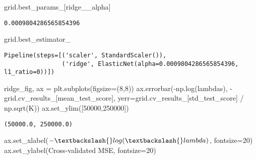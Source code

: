 \documentclass[
  letterpaper,
  DIV=11,
  numbers=noendperiod]{scrreprt}
\newenvironment{Shaded}{\begin{snugshade}}{\end{snugshade}}
\newcommand{\DecValTok}[1]{\textcolor[rgb]{0.68,0.00,0.00}{#1}}
\newcommand{\NormalTok}[1]{\textcolor[rgb]{0.00,0.23,0.31}{#1}}
\newcommand{\OperatorTok}[1]{\textcolor[rgb]{0.37,0.37,0.37}{#1}}
\newcommand{\StringTok}[1]{\textcolor[rgb]{0.13,0.47,0.30}{#1}}
\begin{document}
\begin{Shaded}
\begin{Highlighting}[]
\NormalTok{grid.best\_params\_[}\StringTok{\textquotesingle{}ridge\_\_alpha\textquotesingle{}}\NormalTok{]}
\end{Highlighting}
\end{Shaded}

\begin{verbatim}
0.0009804286565854396
\end{verbatim}

\begin{Shaded}
\begin{Highlighting}[]
\NormalTok{grid.best\_estimator\_}
\end{Highlighting}
\end{Shaded}

\begin{verbatim}
Pipeline(steps=[('scaler', StandardScaler()),
                ('ridge', ElasticNet(alpha=0.0009804286565854396, l1_ratio=0))])
\end{verbatim}

\begin{Shaded}
\begin{Highlighting}[]
\NormalTok{ridge\_fig, ax }\OperatorTok{=}\NormalTok{ plt.subplots(figsize}\OperatorTok{=}\NormalTok{(}\DecValTok{8}\NormalTok{,}\DecValTok{8}\NormalTok{))}
\NormalTok{ax.errorbar(}\OperatorTok{{-}}\NormalTok{np.log(lambdas),}
            \OperatorTok{{-}}\NormalTok{grid.cv\_results\_[}\StringTok{\textquotesingle{}mean\_test\_score\textquotesingle{}}\NormalTok{],}
\NormalTok{            yerr}\OperatorTok{=}\NormalTok{grid.cv\_results\_[}\StringTok{\textquotesingle{}std\_test\_score\textquotesingle{}}\NormalTok{] }\OperatorTok{/}\NormalTok{ np.sqrt(K))}
\NormalTok{ax.set\_ylim([}\DecValTok{50000}\NormalTok{,}\DecValTok{250000}\NormalTok{])}
\end{Highlighting}
\end{Shaded}

\begin{verbatim}
(50000.0, 250000.0)
\end{verbatim}

\begin{Shaded}
\begin{Highlighting}[]
\NormalTok{ax.set\_xlabel(}\StringTok{\textquotesingle{}${-}\textbackslash{}log(\textbackslash{}lambda)$\textquotesingle{}}\NormalTok{, fontsize}\OperatorTok{=}\DecValTok{20}\NormalTok{)}
\NormalTok{ax.set\_ylabel(}\StringTok{\textquotesingle{}Cross{-}validated MSE\textquotesingle{}}\NormalTok{, fontsize}\OperatorTok{=}\DecValTok{20}\NormalTok{)}
\end{Highlighting}
\end{Shaded}
\end{document}
